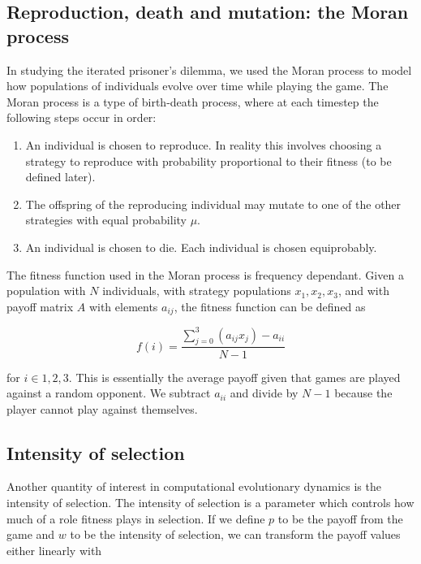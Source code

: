 \subsection{Reproduction, death and mutation: the Moran process}

In studying the iterated prisoner's dilemma, we used the Moran process to model how populations of individuals evolve over time while playing the game.
The Moran process is a type of birth-death process, where at each timestep the following steps occur in order:

\begin{enumerate}
    \item An individual is chosen to reproduce. In reality this involves choosing a strategy to reproduce with probability proportional to their fitness (to be defined later).
    \item The offspring of the reproducing individual may mutate to one of the other strategies with equal probability $\mu$.
    \item An individual is chosen to die. Each individual is chosen equiprobably.
\end{enumerate}

The fitness function used in the Moran process is frequency dependant.
Given a population with $N$ individuals, with strategy populations $x_1, x_2, x_3$, and with payoff matrix $A$ with elements $a_{ij}$, the fitness function can be defined as

\begin{equation*}
    f(i) = \frac{\sum_{j = 0}^3 (a_{ij} x_j) - a_{ii} }{N - 1}
\end{equation*}

for $i \in 1, 2, 3$.
This is essentially the average payoff given that games are played against a random opponent.
We subtract $a_{ii}$ and divide by $N - 1$ because the player cannot play against themselves.

\subsection{Intensity of selection}

Another quantity of interest in computational evolutionary dynamics is the intensity of selection.
The intensity of selection is a parameter which controls how much of a role fitness plays in selection.
If we define $p$ to be the payoff from the game and $w$ to be the intensity of selection, we can transform the payoff values either linearly with

